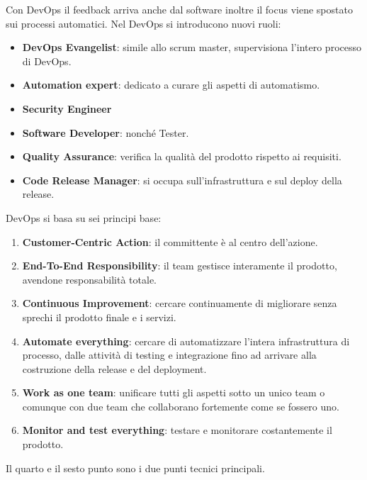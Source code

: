 Con DevOps il feedback arriva anche dal software inoltre il focus viene
spostato sui processi automatici. Nel DevOps si introducono nuovi ruoli:
\begin{itemize}
      \item \textbf{DevOps Evangelist}: simile allo scrum master, supervisiona
            l'intero processo di DevOps.
      \item \textbf{Automation expert}: dedicato a curare gli aspetti di
            automatismo.
      \item \textbf{Security Engineer}
      \item \textbf{Software Developer}: nonché Tester.
      \item \textbf{Quality Assurance}: verifica la qualità del prodotto
            rispetto ai requisiti.
      \item \textbf{Code Release Manager}: si occupa sull'infrastruttura e
            sul deploy della release.
\end{itemize}
DevOps si basa su sei principi base:
\begin{enumerate}
      \item \textbf{Customer-Centric Action}: il committente è al centro dell'azione.
      \item \textbf{End-To-End Responsibility}: il team gestisce interamente
            il prodotto, avendone responsabilità totale.
      \item \textbf{Continuous Improvement}: cercare continuamente di migliorare
            senza sprechi il prodotto finale e i servizi.
      \item \textbf{Automate everything}: cercare di automatizzare l'intera
            infrastruttura di processo, dalle attività di testing e integrazione
            fino ad arrivare alla costruzione della release e del deployment.
      \item \textbf{Work as one team}: unificare tutti gli aspetti sotto un
            unico team o comunque con due team che collaborano fortemente come
            se fossero uno.
      \item \textbf{Monitor and test everything}: testare e monitorare
            costantemente il prodotto.
\end{enumerate}
Il quarto e il sesto punto sono i due punti tecnici principali.
